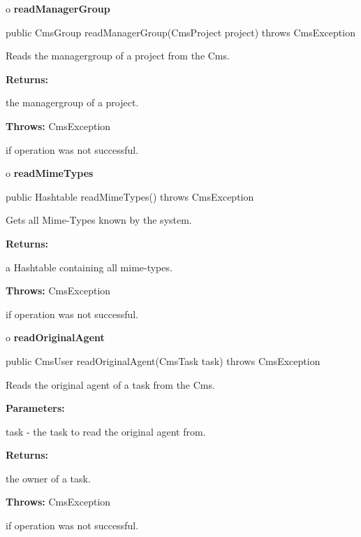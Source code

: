 o {\bf readManagerGroup}

\begin{PRE}
 public CmsGroup readManagerGroup(CmsProject project) throws CmsException
\end{PRE}

\begin{description}
\htmlDD Reads the managergroup of a project from the Cms.

\begin{description}
\item {\bf Returns:}

the managergroup of a project.
\item {\bf Throws:} CmsException

if operation was not successful.
\end{description}

\end{description}

o {\bf readMimeTypes}

\begin{PRE}
 public Hashtable readMimeTypes() throws CmsException
\end{PRE}

\begin{description}
\htmlDD Gets all Mime-Types known by the system.

\begin{description}
\item {\bf Returns:}

a Hashtable containing all mime-types.
\item {\bf Throws:} CmsException

if operation was not successful.
\end{description}

\end{description}

o {\bf readOriginalAgent}

\begin{PRE}
 public CmsUser readOriginalAgent(CmsTask task) throws CmsException
\end{PRE}

\begin{description}
\htmlDD Reads the original agent of a task from the Cms.

\begin{description}
\item {\bf Parameters:}

task - the task to read the original agent from.
\item {\bf Returns:}

the owner of a task.
\item {\bf Throws:} CmsException

if operation was not successful.
\end{description}

\end{description}

